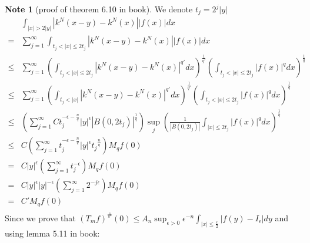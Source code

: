 \documentclass{report}
\theoremstyle{definition}
\newtheorem{note}{Note}
\theoremstyle{definition}
\theoremstyle{plain}
\numberwithin{theorem}{subsection}
\numberwithin{remark}{subsection}
\newcommand{\abs}[1]{\left\lvert#1\right\rvert}
\begin{document}
\begin{note}[proof of theorem 6.10 in book]
    We denote $t_j=2^j\abs{y}$
    \begin{align*}
             & \int_{\abs{x}>2\abs{y}}{\abs{k^N(x-y)-k^N(x)}\abs{f(x)}dx}                                                                                                                                \\
        =    & \sum_{j=1}^{\infty}\int_{t_j<\abs{x}\leq 2t_j}{\abs{k^N(x-y)-k^N(x)}\abs{f(x)}dx}                                                                                                         \\
        \leq & \sum_{j=1}^{\infty}(\int_{t_j<\abs{x}\leq 2t_j}{\abs{k^N(x-y)-k^N(x)}^{q'}dx})^\frac{1}{q'}(\int_{t_j<\abs{x}\leq 2t_j}{\abs{f(x)}^q dx})^\frac{1}{q}                                     \\
        \leq & \sum_{j=1}^{\infty}(\int_{t_j<\abs{x}}{\abs{k^N(x-y)-k^N(x)}^{q'}dx})^\frac{1}{q'}(\int_{t_j<\abs{x}\leq 2t_j}{\abs{f(x)}^q dx})^\frac{1}{q}                                              \\
        \leq & (\sum_{j=1}^{\infty}Ct_{j}^{-\epsilon-\frac{n}{q}}\abs{y}^{\epsilon}\abs{B(0,2t_j)}^{\frac{1}{q}})\sup_j{(\frac{1}{\abs{B(0,2t_j)}}\int_{\abs{x}\leq 2t_j}{\abs{f(x)}^q dx})^\frac{1}{q}} \\
        \leq & C(\sum_{j=1}^{\infty}t_{j}^{-\epsilon-\frac{n}{q}}\abs{y}^{\epsilon}{t_j}^{\frac{n}{q}})M_q f(0)                                                                                          \\
        =    & C\abs{y}^{\epsilon}(\sum_{j=1}^{\infty}t_{j}^{-\epsilon})M_q f(0)                                                                                                                         \\
        =    & C\abs{y}^{\epsilon}\abs{y}^{-\epsilon}(\sum_{j=1}^{\infty}2^{-j\epsilon})M_q f(0)                                                                                                         \\
        =    & C'M_q f(0)                                                                                                                                                                                \\
    \end{align*}
    Since we prove that $(T_mf)^\#(0)\leq A_n\sup_{\epsilon>0}\epsilon^{-n}\int_{\abs{x}\leq\frac{\epsilon}{2}}\abs{f(y)-I_\epsilon}dy$ and using lemma 5.11 in book:
    \begin{align*}

\end{align*}
\end{note}
\end{document}
